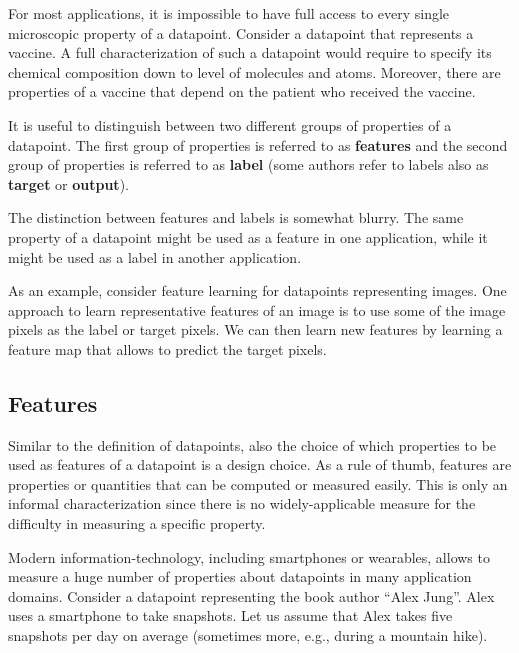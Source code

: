 \documentclass[12pt]{report}
\begin{document}
For most applications, it is impossible to have full access to 
every single microscopic property of a datapoint. Consider a 
datapoint that represents a vaccine. A full characterization of 
such a datapoint would require to specify its chemical composition 
down to level of molecules and atoms. Moreover, there are 
properties of a vaccine that depend on the patient who 
received the vaccine. 

It is useful to distinguish between two different groups of 
properties of a datapoint. The first group of properties is 
referred to as {\bf features}  and the second group of properties 
is referred to as {\bf label} (some authors refer to labels also 
as {\bf target} or {\bf output}). 

The distinction between features and labels is somewhat 
blurry. The same property of a datapoint might be used 
as a feature in one application, while it might be used as 
a label in another application. 

As an example, consider feature learning for datapoints 
representing images. One approach to learn representative 
features of an image is to use some of the image pixels as 
the label or target pixels. We can then learn new features 
by learning  a feature map that allows to predict the target 
pixels. 

\subsection{Features}
\label{sec_feature_space}

Similar to the definition of datapoints, also the choice of which 
properties to be used as features of a datapoint is a design choice. 
As a rule of thumb, features are properties or quantities that can be 
computed or measured easily. This is only an informal characterization 
since there is no widely-applicable measure for the difficulty in 
measuring a specific property. 

Modern information-technology, including smartphones or wearables, 
allows to measure a huge number of properties about datapoints in 
many application domains. Consider a datapoint representing the book 
author ``Alex Jung''. Alex uses a smartphone to take snapshots. 
Let us assume that Alex takes five snapshots per day on average (sometimes 
more, e.g., during a mountain hike). 
\end{document}
